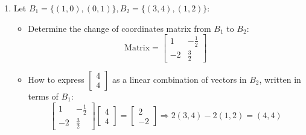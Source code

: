 \documentclass{article}
\begin{document}
\begin{enumerate}
    \item Let $B_1 = \{(1, 0), (0, 1)\}, B_2 = \{(3, 4), (1, 2)\}$:
    \begin{itemize}
        \item Determine the change of coordinates matrix from $B_1$ to $B_2$:
        \[
        \text{Matrix} = \begin{bmatrix} 1 & -\frac{1}{2} \\ -2 & \frac{3}{2} \end{bmatrix}
        \]
        \item How to express $\begin{bmatrix} 4 \\ 4 \end{bmatrix}$ as a linear combination of vectors in $B_2$, written in terms of $B_1$:
        \[
        \begin{bmatrix} 1 & -\frac{1}{2} \\ -2 & \frac{3}{2} \end{bmatrix} \begin{bmatrix} 4 \\ 4 \end{bmatrix} = \begin{bmatrix} 2 \\ -2 \end{bmatrix} \Rightarrow 2(3, 4) - 2(1, 2) = (4, 4)
        \]
    \end{itemize}
\end{enumerate}
\end{document}
